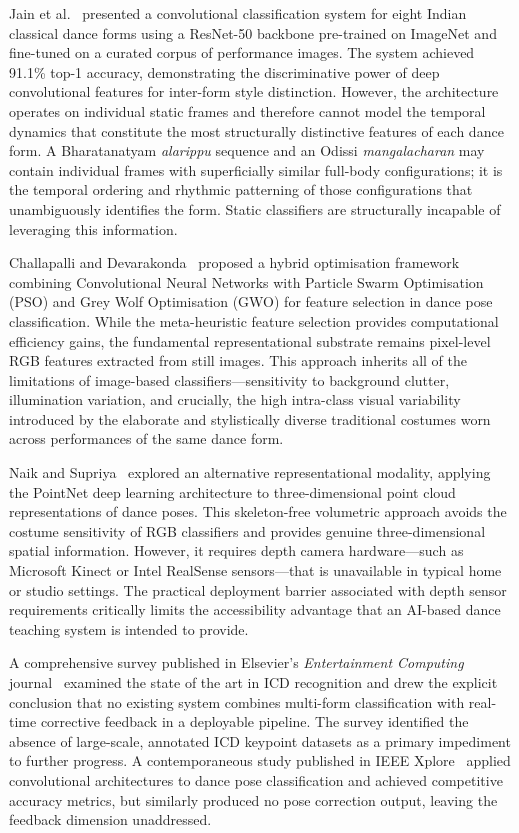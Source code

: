\documentclass[journal]{IEEEtran}
\begin{document}
Jain et al.~\cite{jain2021} presented a convolutional classification
system for eight Indian classical dance forms using a ResNet-50
backbone pre-trained on ImageNet and fine-tuned on a curated corpus
of performance images. The system achieved 91.1\% top-1 accuracy,
demonstrating the discriminative power of deep convolutional features
for inter-form style distinction. However, the architecture operates
on individual static frames and therefore cannot model the temporal
dynamics that constitute the most structurally distinctive features of
each dance form. A Bharatanatyam \textit{alarippu} sequence and an
Odissi \textit{mangalacharan} may contain individual frames with
superficially similar full-body configurations; it is the temporal
ordering and rhythmic patterning of those configurations that
unambiguously identifies the form. Static classifiers are structurally
incapable of leveraging this information.

Challapalli and Devarakonda~\cite{challapalli2022} proposed a hybrid
optimisation framework combining Convolutional Neural Networks with
Particle Swarm Optimisation (PSO) and Grey Wolf Optimisation (GWO)
for feature selection in dance pose classification. While the
meta-heuristic feature selection provides computational efficiency
gains, the fundamental representational substrate remains pixel-level
RGB features extracted from still images. This approach inherits all of
the limitations of image-based classifiers—sensitivity to background
clutter, illumination variation, and crucially, the high intra-class
visual variability introduced by the elaborate and stylistically
diverse traditional costumes worn across performances of the same
dance form.

Naik and Supriya~\cite{naik2021} explored an alternative
representational modality, applying the PointNet deep learning
architecture to three-dimensional point cloud representations of dance
poses. This skeleton-free volumetric approach avoids the costume
sensitivity of RGB classifiers and provides genuine three-dimensional
spatial information. However, it requires depth camera hardware—such
as Microsoft Kinect or Intel RealSense sensors—that is unavailable
in typical home or studio settings. The practical deployment barrier
associated with depth sensor requirements critically limits the
accessibility advantage that an AI-based dance teaching system is
intended to provide.

A comprehensive survey published in Elsevier's \textit{Entertainment
Computing} journal~\cite{survey2024} examined the state of the art in
ICD recognition and drew the explicit conclusion that no existing system
combines multi-form classification with real-time corrective feedback
in a deployable pipeline. The survey identified the absence of
large-scale, annotated ICD keypoint datasets as a primary impediment
to further progress. A contemporaneous study published in
IEEE Xplore~\cite{ieee2025} applied convolutional architectures
to dance pose classification and achieved competitive accuracy metrics,
but similarly produced no pose correction output, leaving the
feedback dimension unaddressed.
\end{document}

